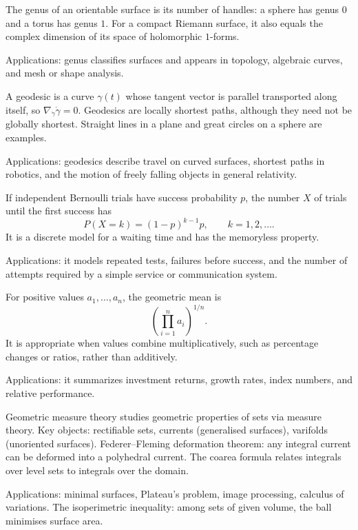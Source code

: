 The genus of an orientable surface is its number of handles: a sphere has genus $0$ and a torus has genus $1$. For a compact Riemann surface, it also equals the complex dimension of its space of holomorphic $1$-forms. \par\noindent Applications: genus classifies surfaces and appears in topology, algebraic curves, and mesh or shape analysis.

A geodesic is a curve $\gamma(t)$ whose tangent vector is parallel transported along itself, so $\nabla_{\dot\gamma}\dot\gamma=0$. Geodesics are locally shortest paths, although they need not be globally shortest. Straight lines in a plane and great circles on a sphere are examples. \par\noindent Applications: geodesics describe travel on curved surfaces, shortest paths in robotics, and the motion of freely falling objects in general relativity.

If independent Bernoulli trials have success probability $p$, the number $X$ of trials until the first success has
\[
P(X=k)=(1-p)^{k-1}p,\qquad k=1,2,\ldots.
\]
It is a discrete model for a waiting time and has the memoryless property. \par\noindent Applications: it models repeated tests, failures before success, and the number of attempts required by a simple service or communication system.

For positive values $a_1,\ldots,a_n$, the geometric mean is
\[
\left(\prod_{i=1}^n a_i\right)^{1/n}.
\]
It is appropriate when values combine multiplicatively, such as percentage changes or ratios, rather than additively. \par\noindent Applications: it summarizes investment returns, growth rates, index numbers, and relative performance.

Geometric measure theory studies geometric properties of sets via measure theory. Key objects: rectifiable sets, currents (generalised surfaces), varifolds (unoriented surfaces). Federer--Fleming deformation theorem: any integral current can be deformed into a polyhedral current. The coarea formula relates integrals over level sets to integrals over the domain. \par\noindent Applications: minimal surfaces, Plateau's problem, image processing, calculus of variations. The isoperimetric inequality: among sets of given volume, the ball minimises surface area.


